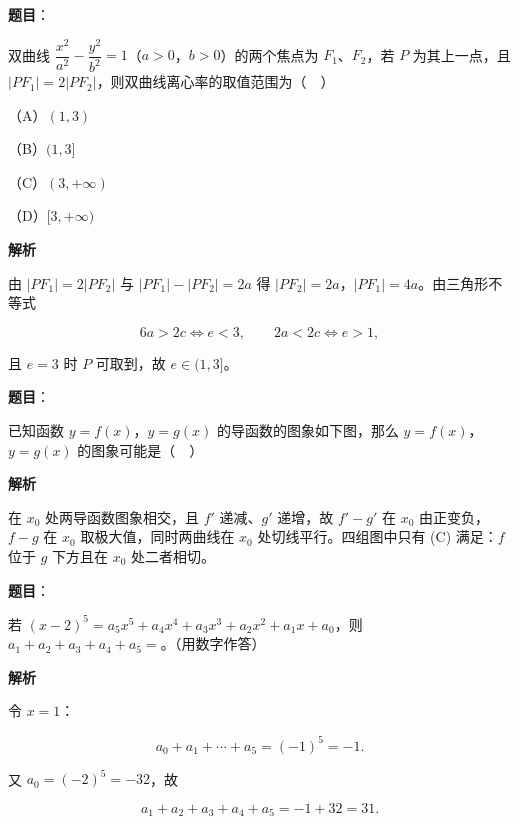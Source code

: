 \begin{answer}

\textbf{题目}：

双曲线 $\dfrac{x^2}{a^2}-\dfrac{y^2}{b^2}=1$（$a>0$，$b>0$）的两个焦点为 $F_1$、$F_2$，若 $P$ 为其上一点，且 $|PF_1|=2|PF_2|$，则双曲线离心率的取值范围为（　）

（A）$(1,3)$

（B）$(1,3]$

（C）$(3,+\infty)$

（D）$[3,+\infty)$

\textbf{解析}

由 $|PF_1|=2|PF_2|$ 与 $|PF_1|-|PF_2|=2a$ 得 $|PF_2|=2a$，$|PF_1|=4a$。由三角形不等式

\nopagebreak[4]
\[6a>2c\iff e<3,\qquad 2a<2c\iff e>1,\]

且 $e=3$ 时 $P$ 可取到，故 $e\in(1,3]$。


\end{answer}
\begin{answer}

\textbf{题目}：

已知函数 $y=f(x)$，$y=g(x)$ 的导函数的图象如下图，那么 $y=f(x)$，$y=g(x)$ 的图象可能是（　）
\nopagebreak[4]
\begin{center}\end{center}
\nopagebreak[4]
\textbf{解析}

在 $x_0$ 处两导函数图象相交，且 $f'$ 递减、$g'$ 递增，故 $f'-g'$ 在 $x_0$ 由正变负，$f-g$ 在 $x_0$ 取极大值，同时两曲线在 $x_0$ 处切线平行。四组图中只有 (C) 满足：$f$ 位于 $g$ 下方且在 $x_0$ 处二者相切。


\end{answer}
\begin{answer}

\textbf{题目}：

若 $(x-2)^5=a_5x^5+a_4x^4+a_3x^3+a_2x^2+a_1x+a_0$，则 $a_1+a_2+a_3+a_4+a_5=$\gkblank{}。（用数字作答）

\textbf{解析}

令 $x=1$：

\nopagebreak[4]
\[a_0+a_1+\cdots+a_5=(-1)^5=-1.\]

又 $a_0=(-2)^5=-32$，故

\nopagebreak[4]
\[a_1+a_2+a_3+a_4+a_5=-1+32=31.\]


\end{answer}
